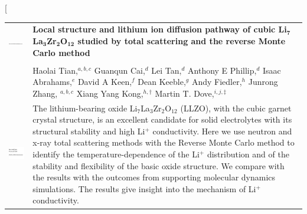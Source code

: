 \documentclass[twoside,twocolumn,9pt]{article}
\begin{document}
\twocolumn[
  \begin{@twocolumnfalse}
\vspace{3cm}
\sffamily
\begin{tabular}{m{4.5cm} p{13.5cm} }

\includegraphics{head_foot/DOI} & \noindent\LARGE{\textbf{Local structure and lithium ion diffusion pathway of cubic Li$_\mathbf{7}$La$_\mathbf{3}$Zr$_\mathbf{2}$O$_\mathbf{12}$ studied by total scattering and the reverse Monte Carlo method}} \\%
\vspace{0.3cm} & \vspace{0.3cm} \\

 & \noindent\large{Haolai Tian,$^{a,b,c}$}
 Guanqun Cai,$^{d}$
 Lei Tan,$^{d}$
 Anthony E Phillip,$^{d}$
 Isaac Abrahams,$^{e}$
 David A Keen,$^{f}$
 Dean Keeble,$^{g}$
 Andy Fiedler,$^{h}$
  Junrong Zhang, $^{a,b,c}$
Xiang Yang Kong,$^{h, \dag}$
Martin T. Dove,\textit{$^{i,j,\ddag}$}
\\%

\includegraphics{head_foot/dates} & \noindent\normalsize{
The lithium-bearing oxide Li$_7$La$_3$Zr$_2$O$_{12}$ (LLZO), with the cubic garnet crystal structure, is an excellent candidate for solid electrolytes with its structural stability and high Li$^+$ conductivity. Here we use neutron and x-ray total scattering methods with the Reverse Monte Carlo method to identify the temperature-dependence of the Li$^+$ distribution and of the stability and flexibility of the basic oxide structure. We compare with the results with the outcomes from supporting molecular dynamics simulations. The results give insight into the mechanism  of Li$^+$ conductivity.
} \\

\end{tabular}

 \end{@twocolumnfalse} \vspace{0.6cm}
\end{document}

